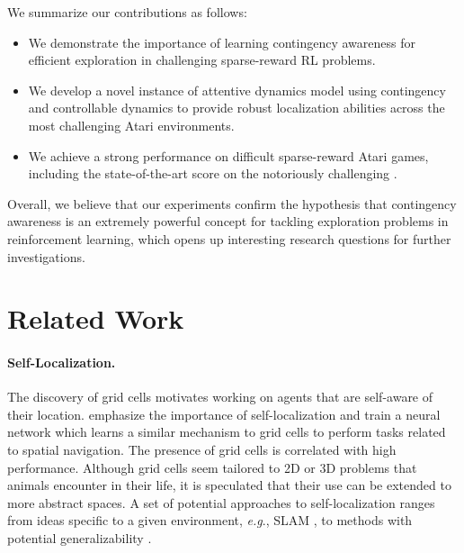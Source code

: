 \documentclass{article} \usepackage{iclr,times}
\makeatletter
\DeclareRobustCommand\onedot{\futurelet\@let@token\@onedot}
\def\onedot{.}
\def\eg{\emph{e.g}\onedot} \def\Eg{\emph{E.g}\onedot}
\makeatother
\begin{document}
We summarize our contributions as follows:
\vspace*{-2pt}
\begin{itemize}[leftmargin=15pt]
    \setlength{\itemsep}{0pt}\setlength{\parskip}{2pt}
	\item We demonstrate the importance of learning contingency awareness for efficient exploration in challenging sparse-reward RL problems.
	\item We develop a novel instance of attentive dynamics model using contingency and controllable dynamics to provide robust localization abilities across the most challenging Atari environments. 
	\item We achieve a strong performance on difficult sparse-reward Atari games, including the state-of-the-art score on the notoriously challenging \MontezumaRevenge.
\end{itemize}
Overall, we believe that our experiments confirm the hypothesis that contingency awareness is an extremely powerful concept for tackling exploration problems in reinforcement learning, which opens up interesting research questions for further investigations.
 



\clearpage

\section{Related Work}
\label{sec:related-work}





\vspace*{-7pt}
\paragraph{Self-Localization.}
The discovery of grid cells \citep{Moser:2015:GridCell} motivates working on agents that are self-aware of their location.
\cite{Banino:Nature2018:NavigateAI}
emphasize the importance of self-localization and train a neural network which learns a similar mechanism to grid cells
to perform tasks related to spatial navigation. The presence of grid cells is correlated with high performance.
Although grid cells seem tailored to 2D or 3D problems that animals encounter in their life,
it is speculated that their use can be extended to more abstract spaces.
A set of potential approaches to self-localization ranges from ideas specific to a given environment, \eg, SLAM \citep{Durrant:2006:SLAM}, to methods with potential generalizability
\citep{Mirowski:ICLR2017:Navigate,Jaderberg:ICLR2017:RLAux,Mirowski:NIPS2018:StreetLearn}.
\end{document}
